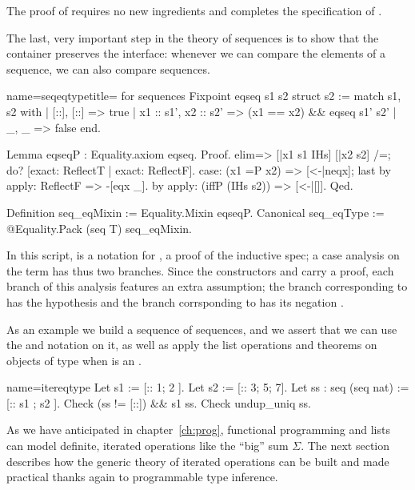 The proof of  requires no new ingredients and
completes the specification of .

The last, very important step in the theory of sequences is to show
that the container preserves the  interface: whenever we can
compare the elements of a sequence, we can also compare sequences.

\begin{coq}{name=seqeqtype}{title= for sequences}
Fixpoint eqseq s1 s2 {struct s2} :=
  match s1, s2 with
  | [::], [::] => true
  | x1 :: s1', x2 :: s2' => (x1 == x2) && eqseq s1' s2'
  | _, _ => false
  end.

Lemma eqseqP : Equality.axiom eqseq.
Proof.
elim=> [|x1 s1 IHs] [|x2 s2] /=; do? [exact: ReflectT | exact: ReflectF].
case: (x1 =P x2) => [<-|neqx]; last by apply: ReflectF => -[eqx _].
by apply: (iffP (IHs s2)) => [<-|[]].
Qed.

Definition seq_eqMixin := Equality.Mixin eqseqP.
Canonical seq_eqType := @Equality.Pack (seq T) seq_eqMixin.
\end{coq}
In this script,  is a notation for ,
a proof of the  inductive spec; a case analysis on the term
  has thus two branches. Since the constructors
 and  carry a proof, each branch of this
analysis features an extra assumption; the branch corresponding to
 has the hypothesis  and the branch
corrsponding to  has its negation .

As an example we build a sequence of sequences, and we assert that
we can use the \C{==} and \C{\\in} notation on it, as well as apply
the list operations and theorems on objects of type 
when  is an .

\begin{coq}{name=itereqtype}{}
Let s1 := [:: 1; 2 ].
Let s2 := [:: 3; 5; 7].
Let ss :  seq (seq nat) := [:: s1 ; s2 ].
Check (ss != [::]) && s1 \in ss.
Check undup_uniq ss.
\end{coq}

As we have anticipated in chapter~\ref{ch:prog}, functional programming and lists
can model definite, iterated operations like the ``big'' sum
$\Sigma$.  The next section describes how the generic theory
of iterated operations can be built and made practical thanks again
to programmable type inference.

